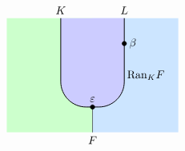 {\[\begin{tikzpicture}
    \begin{scope}[shift={(7.5,0)}]
        \begin{scope} 
            \clip (-2.7,0) rectangle (2.7, 3.6);     
            \fill[fill=leftcolor] (-3,0) rectangle (0, 4);  
            \fill[fill=rightcolor] (0,0) rectangle (3, 4);  
            \draw[fill=midcolor, rounded corners=0.8cm, line width=0.7pt] (-1, 5.6) rectangle (1, 0.8);
        \end{scope}
        \draw (0, 0) -- (0,0.8);
        \filldraw [black] (1,2.8) circle (2pt) node[right=1pt] {$\beta$};
   
        \node[above] at (-1, 3.6) {$K$};
        \node[right=-1pt] at (1, 1.8) {$\mathrm{Ran}_KF$};

        \node[above] at (1, 3.6) {$L$};
        \filldraw [black] (0, 0.8) circle (2pt) node[above=1pt] {$\varepsilon$};
    
       
        \node[below] at (0, 0) {$F$};
    \end{scope}

    
    \end{tikzpicture}
\]


}

